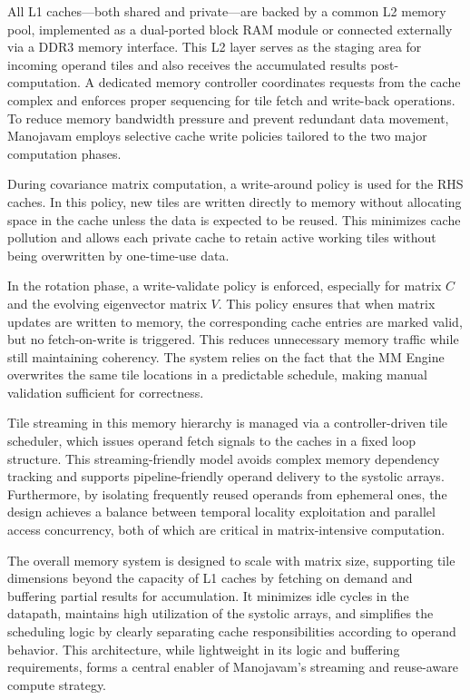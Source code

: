 All L1 caches—both shared and private—are backed by a common L2 memory pool, implemented as a dual-ported block RAM module or connected externally via a DDR3 memory interface. This L2 layer serves as the staging area for incoming operand tiles and also receives the accumulated results post-computation. A dedicated memory controller coordinates requests from the cache complex and enforces proper sequencing for tile fetch and write-back operations. To reduce memory bandwidth pressure and prevent redundant data movement, Manojavam employs selective cache write policies tailored to the two major computation phases.

During covariance matrix computation, a write-around policy is used for the RHS caches. In this policy, new tiles are written directly to memory without allocating space in the cache unless the data is expected to be reused. This minimizes cache pollution and allows each private cache to retain active working tiles without being overwritten by one-time-use data.

In the rotation phase, a write-validate policy is enforced, especially for matrix $C$ and the evolving eigenvector matrix $V$. This policy ensures that when matrix updates are written to memory, the corresponding cache entries are marked valid, but no fetch-on-write is triggered. This reduces unnecessary memory traffic while still maintaining coherency. The system relies on the fact that the MM Engine overwrites the same tile locations in a predictable schedule, making manual validation sufficient for correctness.

Tile streaming in this memory hierarchy is managed via a controller-driven tile scheduler, which issues operand fetch signals to the caches in a fixed loop structure. This streaming-friendly model avoids complex memory dependency tracking and supports pipeline-friendly operand delivery to the systolic arrays. Furthermore, by isolating frequently reused operands from ephemeral ones, the design achieves a balance between temporal locality exploitation and parallel access concurrency, both of which are critical in matrix-intensive computation.

The overall memory system is designed to scale with matrix size, supporting tile dimensions beyond the capacity of L1 caches by fetching on demand and buffering partial results for accumulation. It minimizes idle cycles in the datapath, maintains high utilization of the systolic arrays, and simplifies the scheduling logic by clearly separating cache responsibilities according to operand behavior. This architecture, while lightweight in its logic and buffering requirements, forms a central enabler of Manojavam’s streaming and reuse-aware compute strategy.   

